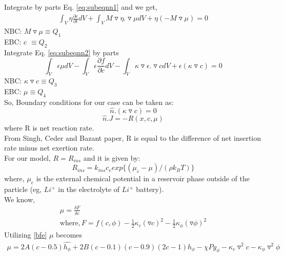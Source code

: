 \documentclass{article}
\begin{document}
Integrate by parts Eq. \eqref{eq:subeqnn1} and we get,
\begin{align}
\int_{V} \eta \frac{\partial c}{\partial t} dV + \int_{V} M \triangledown \eta . \triangledown \mu dV + \eta (-M \triangledown \mu) = 0
\end{align}
NBC: $M \triangledown \mu \equiv Q_1$ \\
EBC: c $\equiv Q_2 $ \\
Integrate Eq. \eqref{eq:subeqnn2} by parts
\begin{equation}
\int_{V} \epsilon \mu dV - \int_{V} \epsilon \frac{\partial f}{\partial c} dV - \int_{V} \kappa \triangledown \epsilon . \triangledown c dV +  \epsilon \left( \kappa \triangledown c \right)= 0
\end{equation}
NBC: $\kappa \triangledown c \equiv Q_3$ \\
EBC: $\mu \equiv Q_4 $ \\
So, Boundary conditions for our case can be taken as:\\
\begin{equation} \label{BC1}
\hat{n}	.(\kappa \triangledown c) = 0
\end{equation}
\begin{equation}\label{BC2}
\hat{n}.J = - R(x,c,\mu)
\end{equation}
\qquad where R is net reaction rate.\\
From Singh, Ceder and Bazant paper, R is equal to the difference of net insertion rate minus net exertion rate.\\
For our model, $R = R_{ins}$ and it is given by:
\begin{equation}\label{Rins}
R_{ins} = k_{ins}c_e exp\Big\{(\mu_e-\mu)/(\rho k_BT)\Big\}
\end{equation}
where, $\mu_e$ is the external chemical potential in a reservoir phase outside of the particle (eg, $Li^+$ in the electrolyte of $Li^+$ battery).\\
We know,
\begin{gather} 
\mu = \frac{\delta F}{\delta c} \\ 
\text{where}, F = f(c,\phi) - \frac{1}{2} \kappa_c (\triangledown c)^2 - \frac{1}{2} \kappa_{\phi} (\triangledown \phi)^2 \nonumber
\end{gather}
Utilizing \eqref{bfe} $\mu$ becomes
\begin{gather}\label{mu}
\mu = 2A(c-0.5)\hat{h_\phi} + 2B(c-0.1)(c-0.9)(2c-1)h_\phi - \chi P g_\phi - \kappa_c \triangledown^2c -\kappa_{\phi} \triangledown^2 \phi
\end{gather}
\end{document}

